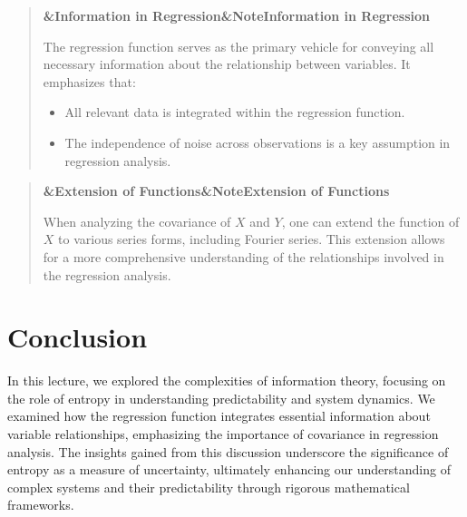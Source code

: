 \documentclass[a4paper]{article}
\newcommand{\boxheading}[1]{%
  \par\smallskip
  \noindent\textbf{\ifx&#1&Note\else#1\fi}\par
  \smallskip
}
\newenvironment{defbox}[1][]{%
  \begin{quote}\color{green!40!black}\boxheading{#1}\normalcolor
}{\end{quote}}
\newenvironment{rembox}[1][]{%
  \begin{quote}\color{black!70}\boxheading{#1}\normalcolor
}{\end{quote}}
\begin{document}
\begin{rembox}[Information in Regression]
The regression function serves as the primary vehicle for conveying all necessary information about the relationship between variables. It emphasizes that:
\begin{itemize}
    \item All relevant data is integrated within the regression function.
    \item The independence of noise across observations is a key assumption in regression analysis.
\end{itemize}
\end{rembox}

\begin{defbox}[Extension of Functions]
When analyzing the covariance of \( X \) and \( Y \), one can extend the function of \( X \) to various series forms, including Fourier series. This extension allows for a more comprehensive understanding of the relationships involved in the regression analysis.
\end{defbox}

\section{Conclusion}
In this lecture, we explored the complexities of information theory, focusing on the role of entropy in understanding predictability and system dynamics. We examined how the regression function integrates essential information about variable relationships, emphasizing the importance of covariance in regression analysis. The insights gained from this discussion underscore the significance of entropy as a measure of uncertainty, ultimately enhancing our understanding of complex systems and their predictability through rigorous mathematical frameworks.
\end{document}
